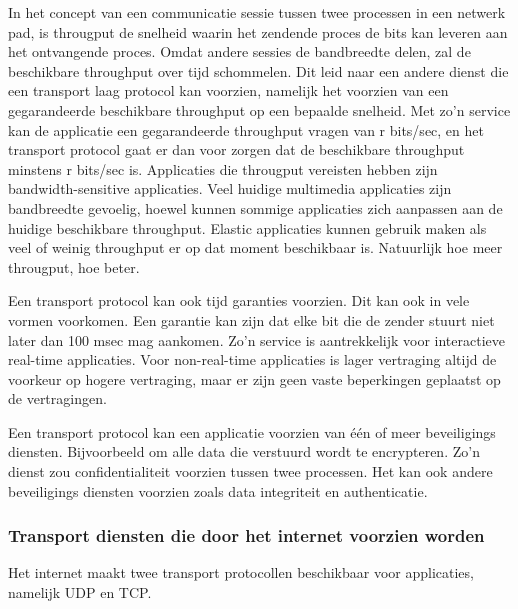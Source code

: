 In het concept van een communicatie sessie tussen twee processen in een netwerk pad, is througput de snelheid waarin het zendende proces de bits kan leveren aan het ontvangende proces. Omdat andere sessies de bandbreedte delen, zal de beschikbare throughput over tijd schommelen. Dit leid naar een andere dienst die een transport laag protocol kan voorzien, namelijk het voorzien van een gegarandeerde beschikbare throughput op een bepaalde snelheid. Met zo’n service kan de applicatie een gegarandeerde throughput vragen van r bits/sec, en het transport protocol gaat er dan voor zorgen dat de beschikbare throughput minstens r bits/sec is. Applicaties die througput vereisten hebben zijn bandwidth-sensitive applicaties. Veel huidige multimedia applicaties zijn bandbreedte gevoelig, hoewel kunnen sommige applicaties zich aanpassen aan de huidige beschikbare throughput. Elastic applicaties kunnen gebruik maken als veel of weinig throughput er op dat moment beschikbaar is. Natuurlijk hoe meer througput, hoe beter.


Een transport protocol kan ook tijd garanties voorzien. Dit kan ook in vele vormen voorkomen. Een garantie kan zijn dat elke bit die de zender stuurt niet later dan 100 msec mag aankomen. Zo’n service is aantrekkelijk voor interactieve real-time applicaties. Voor non-real-time applicaties is lager vertraging altijd de voorkeur op hogere vertraging, maar er zijn geen vaste beperkingen geplaatst op de vertragingen.


Een transport protocol kan een applicatie voorzien van één of meer beveiligings diensten. Bijvoorbeeld om alle data die verstuurd wordt te encrypteren. Zo’n dienst zou confidentialiteit voorzien tussen twee processen. Het kan ook andere beveiligings diensten voorzien zoals data integriteit en authenticatie.

\subsubsection{Transport diensten die door het internet voorzien worden}

Het internet maakt twee transport protocollen beschikbaar voor applicaties, namelijk UDP en TCP.

\clearpage


